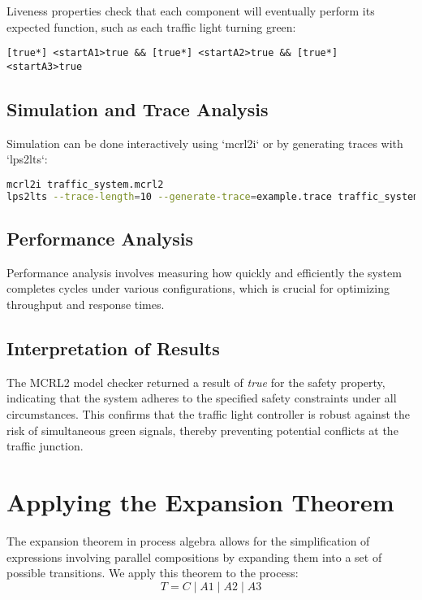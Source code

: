 \documentclass{article}
\begin{document}
Liveness properties check that each component will eventually perform its expected function, such as each traffic light turning green:

\begin{verbatim}
[true*] <startA1>true && [true*] <startA2>true && [true*] <startA3>true
\end{verbatim}

\subsection{Simulation and Trace Analysis}

Simulation can be done interactively using `mcrl2i` or by generating traces with `lps2lts`:

\begin{lstlisting}[language=bash]
mcrl2i traffic_system.mcrl2
lps2lts --trace-length=10 --generate-trace=example.trace traffic_system.lps
\end{lstlisting}

\subsection{Performance Analysis}

Performance analysis involves measuring how quickly and efficiently the system completes cycles under various configurations, which is crucial for optimizing throughput and response times.


\subsection{Interpretation of Results}
The MCRL2 model checker returned a result of \textit{true} for the safety property, indicating that the system adheres to the specified safety constraints under all circumstances. This confirms that the traffic light controller is robust against the risk of simultaneous green signals, thereby preventing potential conflicts at the traffic junction.



\section*{Applying the Expansion Theorem}

The expansion theorem in process algebra allows for the simplification of expressions involving parallel compositions by expanding them into a set of possible transitions. We apply this theorem to the process:
\[ T = C \mid A1 \mid A2 \mid A3 \]
\end{document}
